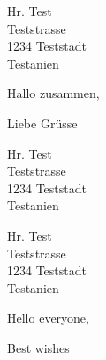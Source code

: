 \documentclass{amivletter}
\begin{document}
\subject{\LaTeX\ Brief ist da, Feedback erwünscht!}
\signature{Alexander}


\begin{letter}{%
    Hr. Test\\
    Teststrasse\\
    1234 Teststadt\\
    Testanien%
}

\opening{Hallo zusammen,}

\Blindtext

\closing{Liebe Grüsse}


\end{letter}



\genericamivinfoblock  %

\subject{}

\begin{letter}{%
    Hr. Test\\
    Teststrasse\\
    1234 Teststadt\\
    Testanien%
}

\opening{}

\blindtext

\end{letter}

\begin{english}
\amivinfoblock
\subject{\LaTeX\ Letter available, Feedback desired!}
\signature{Alexander}
\begin{letter}{%
        Hr. Test\\
        Teststrasse\\
        1234 Teststadt\\
        Testanien%
    }
    
    \opening{Hello everyone,}
    
    \Blindtext
    
    \closing{Best wishes}
    
\end{letter}
\end{english}
\end{document}
